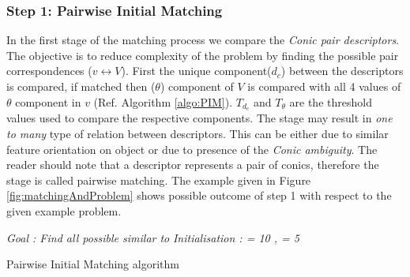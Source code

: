 \documentclass{bmvc2k}
\begin{document}
\subsubsection{Step 1: Pairwise Initial Matching}
\label{subsubSec:PIM}
In the first stage of the matching process we compare the \textit{Conic pair descriptors}.
The objective is to reduce complexity of the problem by finding the possible pair correspondences ($ v \leftrightarrow V $). 
First the unique component($ d_c $) between the descriptors is compared, if matched then ($ \theta $) component of $ V $ is compared with all 4 values of $ \theta $ component in $ v $ (Ref. Algorithm \ref{algo:PIM}). 
$ T_{d_c} $ and $ T_\theta $ are the threshold values used to compare the respective components. 
The stage may result in \textit{one to many} type of relation between descriptors. This can be either due to similar feature orientation on object or due to presence of the \textit{Conic ambiguity}. 
The reader should note that a descriptor represents a pair of conics, therefore the stage is called pairwise matching.
The example given in Figure \ref{fig:matchingAndProblem} shows possible outcome of step 1 with respect to the given example problem. 

\begin{algorithm} \label{algo:PIM}
\emph{Goal : Find all possible \threeDFv similar to \twoDFv} \;
\emph{Initialisation : \ThresholdD = 10 , \ThresholdA = 5} \; 
\caption{Pairwise Initial Matching algorithm}
\end{algorithm}

\end{document}
